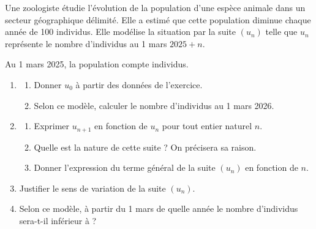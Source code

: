 Une zoologiste étudie l'évolution de la population d'une espèce animale dans un secteur géographique délimité. Elle a estimé que cette population diminue chaque année de 100 individus. Elle modélise la situation par la suite $\left(u_n\right)$ telle que $u_n$ représente le nombre d'individus au 1 mars $2025+n$.

Au 1 mars 2025, la population compte  individus.

\begin{enumerate}
	\item
	\begin{enumerate}
		\item Donner $u_0$ à partir des données de l'exercice.
		\item Selon ce modèle, calculer le nombre d'individus au 1 mars 2026.
	\end{enumerate}

	\item
	\begin{enumerate}
		\item Exprimer $u_{n+1}$ en fonction de $u_n$ pour tout entier naturel $n$.
		\item Quelle est la nature de cette suite ? On précisera sa raison.
		\item Donner l'expression du terme général de la suite $\left(u_n\right)$ en fonction de $n$.
	\end{enumerate}

	\item Justifier le sens de variation de la suite $\left(u_n\right)$.
	\item Selon ce modèle, à partir du 1 mars de quelle année le nombre d'individus sera-t-il inférieur à  ?
\end{enumerate}

\medskip
